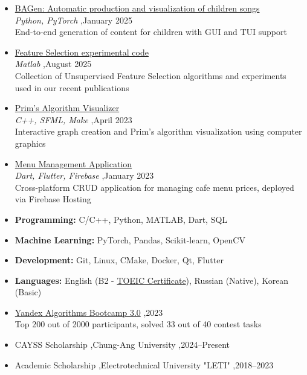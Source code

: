 \documentclass[letterpaper,10pt]{article}
\begin{document}
\begin{itemize}
\item \href{https://github.com/KhrTim/BAGen}{BAGen: Automatic production and visualization of children songs}\\
\textit{Python, PyTorch} \sep January 2025\\
End-to-end generation of content for children with GUI and TUI support
\item \href{https://github.com/KhrTim/Feature_Selection}{Feature Selection experimental code} \\ 
\textit{Matlab} \sep August 2025\\
Collection of Unsupervised Feature Selection algorithms and experiments used in our recent publications
\item \href{https://github.com/KhrTim/Prim-s-Algorithm-Visualizer}{Prim's Algorithm Visualizer}\\
\textit{C++, SFML, Make} \sep April 2023\\
Interactive graph creation and Prim's algorithm visualization using computer graphics
\item \href{https://product-list-cv.web.app/\#/}{Menu Management Application}\\
\textit{Dart, Flutter, Firebase} \sep January 2023\\
Cross-platform CRUD application for managing cafe menu prices, deployed via Firebase Hosting
\end{itemize}


\begin{itemize}
\item \textbf{Programming:} C/C++, Python, MATLAB, Dart, SQL
\item \textbf{Machine Learning:} PyTorch, Pandas, Scikit-learn, OpenCV
\item \textbf{Development:} Git, Linux, CMake, Docker, Qt, Flutter
\item \textbf{Languages:} English (B2 - \href{https://github.com/KhrTim/Certificates/blob/main/TOEIC_Score.JPG}{TOEIC Certificate}), Russian (Native), Korean (Basic)
\end{itemize}



\begin{itemize}
\item \href{https://github.com/KhrTim/Certificates/blob/main/yandex-certificate.pdf}{Yandex Algorithms Bootcamp 3.0} \sep 2023\\
Top 200 out of 2000 participants, solved 33 out of 40 contest tasks
\item CAYSS Scholarship \sep Chung-Ang University \sep 2024--Present
\item Academic Scholarship \sep Electrotechnical University "LETI" \sep 2018--2023
\end{itemize}
\end{document}
